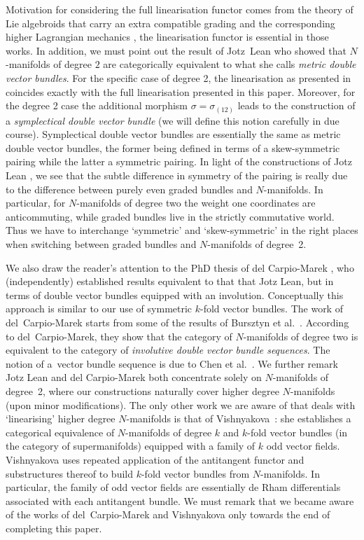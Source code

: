 \documentclass[10pt,a4paper]{amsart}
\numberwithin{equation}{section}
\begin{document}
Motivation for considering the full linearisation functor comes from the theory of Lie algebroids that carry an extra compatible grading and the corresponding higher Lagrangian mecha\-nics \cite{Bruce:2014b, Bruce:2014}, the linearisation functor is essential in those works. In addition, we must point out the result of Jotz~Lean \cite{JotzLean:2015} who showed that $N$-manifolds of degree $2$ are categorically equivalent to what she calls \emph{metric double vector bundles}. For the specif\/ic case of degree 2, the linearisation as presented in \cite{Bruce:2014} coincides exactly with the full linearisation presented in this paper. Moreover, for the degree 2 case the additional morphism $\sigma = \sigma_{(12)}$ leads to the construction of a \emph{symplectical double vector bundle} (we will def\/ine this notion carefully in due course). Symplectical double vector bundles are essentially the same as metric double vector bundles, the former being def\/ined in terms of a skew-symmetric pairing while the latter a symmetric pairing. In light of the constructions of Jotz Lean \cite{JotzLean:2015}, we see that the subtle dif\/ference in symmetry of the pairing is really due to the dif\/ference between purely even graded bundles and $N$-manifolds. In particular, for $N$-manifolds of degree two the weight one coordinates are anticommuting, while graded bundles live in the strictly commutative world. Thus we have to interchange `symmetric' and `skew-symmetric' in the right places when switching between graded bundles and $N$-manifolds of degree~2.

 We also draw the reader's attention to the PhD thesis of del Carpio-Marek \cite{Carpio-Marek:2015}, who (independently) established results equivalent to that that Jotz Lean, but in terms of double vector bundles equipped with an involution. Conceptually this approach is similar to our use of symmetric $k$-fold vector bundles. The work of del~Carpio-Marek starts from some of the results of Bursztyn et al.~\cite{Bursztyn:2015+}. According to del~Carpio-Marek, they show that the category of $N$-manifolds of degree two is equivalent to the category of \emph{involutive double vector bundle sequences}. The notion of a~vector bundle sequence is due to Chen et al.~\cite{Chen:2014}. We further remark Jotz Lean and del Carpio-Marek both concentrate solely on $N$-manifolds of degree~2, where our constructions naturally cover higher degree $N$-manifolds (upon minor modif\/ications). The only other work we are aware of that deals with `linearising' higher degree $N$-manifolds is that of Vishnyakova~\cite{Vishnyakova:2015}: she establishes a categorical equivalence of $N$-manifolds of degree $k$ and $k$-fold vector bundles (in the category of supermanifolds) equipped with a family of $k$ odd vector f\/ields. Vishnyakova uses repeated application of the antitangent functor and substructures thereof to build $k$-fold vector bundles from $N$-manifolds. In particular, the family of odd vector f\/ields are essentially de Rham dif\/ferentials associated with each antitangent bundle. We must remark that we became aware of the works of del~Carpio-Marek and Vishnyakova only towards the end of completing this paper.
\end{document}
